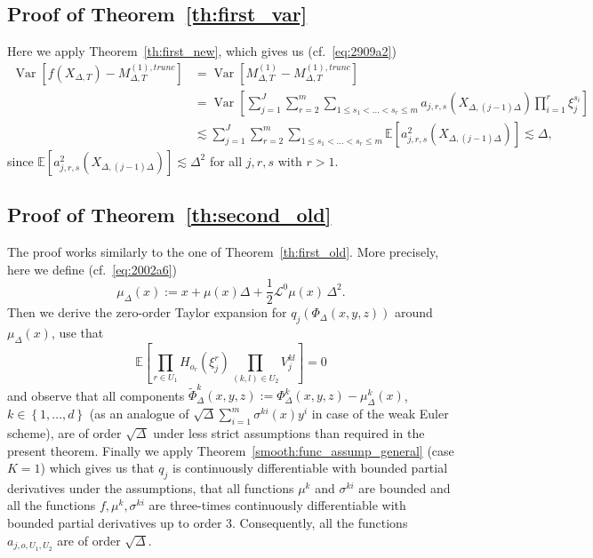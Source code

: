 \documentclass[11pt,a4paper]{amsart}
\theoremstyle{plain}
\theoremstyle{definition}
\theoremstyle{remark}
\numberwithin{equation}{section}
\newcommand*{\Var}{\operatorname{Var}}
\newcommand*{\EE}{\mathbb E}
\newcommand*{\cL}{\mathcal L}
\begin{document}
\subsection{Proof of Theorem~\protect\ref{th:first_var}}
Here we apply Theorem~\ref{th:first_new}, which gives us (cf.~\eqref{eq:2909a2})
\begin{align*}
\Var\left[f(X_{\Delta,T})-M_{\Delta,T}^{(1),trunc}\right]&=\Var\left[M_{\Delta,T}^{(1)}-M_{\Delta,T}^{(1),trunc}\right]\\
&=\Var\left[\sum_{j=1}^J
\sum_{r=2}^m
\sum_{1\le s_1<\ldots<s_r\le m}
a_{j,r,s}(X_{\Delta,(j-1)\Delta})
\prod_{i=1}^r \xi_j^{s_i}\right] \\
&\lesssim\sum_{j=1}^J
\sum_{r=2}^m
\sum_{1\le s_1<\ldots<s_r\le m}\EE\left[a_{j,r,s}^2(X_{\Delta,(j-1)\Delta})
\right]\lesssim \Delta,
\end{align*}
since $\EE\left[a_{j,r,s}^2(X_{\Delta,(j-1)\Delta})
\right]\lesssim\Delta^2$ for all $j,r,s$ with $r>1$.










\subsection{Proof of Theorem~\protect\ref{th:second_old}}
The proof works similarly to the one of Theorem~\ref{th:first_old}. More precisely, here we define (cf.~\eqref{eq:2002a6})
$$
\mu_\Delta(x):=x+\mu(x)\Delta+\frac12\cL^0\mu(x)\,\Delta^2.
$$
Then we derive the zero-order Taylor expansion for $q_j(\Phi_\Delta(x,y,z))$ around $\mu_\Delta(x)$, use that 
\[
\EE\left[\prod_{r\in U_1} H_{o_r}(\xi_j^r)
\prod_{(k,l)\in U_2} V_j^{kl}\right]=0
\]
 and observe that all components $\tilde\Phi_\Delta^k(x,y,z):=\Phi_\Delta^k(x,y,z)-\mu_\Delta^k(x)$, $k\in\left\{1,\ldots,d\right\}$ (as an analogue of $\sqrt{\Delta}\sum_{i=1}^m\sigma^{ki}(x)y^i$ in case of the weak Euler scheme), are of order $\sqrt{\Delta}$ under less strict assumptions than required in the present theorem. Finally we apply Theorem~\ref{smooth:func_assump_general} (case $K=1$) which gives us that $q_j$ is continuously differentiable with bounded partial derivatives under the assumptions, that all functions $\mu^k$ and $\sigma^{ki}$ are bounded and all the functions $f,\mu^k,\sigma^{ki}$ are three-times continuously differentiable with bounded partial derivatives up to order 3. Consequently, all the functions $a_{j,o,U_1,U_2}$ are of order $\sqrt{\Delta}$.
\end{document}
